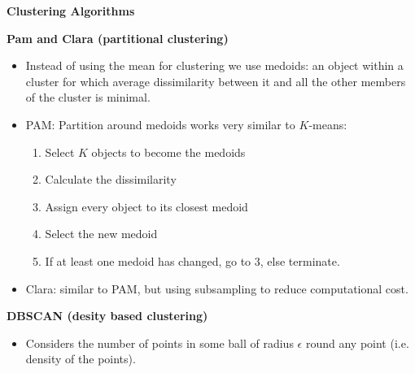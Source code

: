 \documentclass{article}
\begin{document}
{\Large \textbf{Clustering Algorithms}}

\bigskip

\textbf{Pam and Clara (partitional clustering)}

\begin{itemize}
    \item Instead of using the mean for clustering we use medoids: an object within a cluster for which average dissimilarity between it and all the other members of the cluster is minimal. 
    \item PAM: Partition around medoids works very similar to $K$-means:
    \begin{enumerate}
        \item Select $K$ objects to become the medoids
        \item Calculate the dissimilarity
        \item Assign every object to its closest medoid
        \item Select the new medoid
        \item If at least one medoid has changed, go to $3$, else terminate. 
    \end{enumerate}
    \item Clara: similar to PAM, but using subsampling to reduce computational cost. 
\end{itemize}

\textbf{DBSCAN (desity based clustering)}
\begin{itemize}
    \item Considers the number of points in some ball of radius $\epsilon$ round any point (i.e. density of the points). 
\end{itemize}
\end{document}
